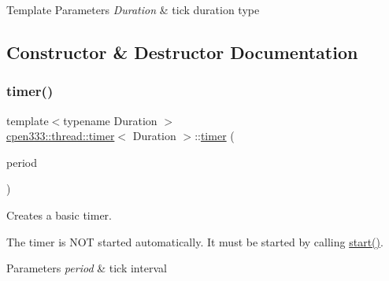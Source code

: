 \begin{DoxyTemplParams}{Template Parameters}
{\em Duration} & tick duration type \\
\hline
\end{DoxyTemplParams}


\subsection{Constructor \& Destructor Documentation}
\mbox{\label{classcpen333_1_1thread_1_1timer_adf189ddfc276e7efa2c49ac9413627b9}} 
\subsubsection{\texorpdfstring{timer()}{timer()}\hspace{0.1cm}{\footnotesize\ttfamily [1/2]}}
{\footnotesize\ttfamily template$<$typename Duration $>$ \\
\hyperlink{classcpen333_1_1thread_1_1timer}{cpen333\+::thread\+::timer}$<$ Duration $>$\+::\hyperlink{classcpen333_1_1thread_1_1timer}{timer} (\begin{DoxyParamCaption}\item[{const Duration \&}]{period }\end{DoxyParamCaption})\hspace{0.3cm}{\ttfamily [inline]}}



Creates a basic timer. 

The timer is N\+OT started automatically. It must be started by calling \hyperlink{classcpen333_1_1thread_1_1timer_a0d1be90402f46912966ec5fc13707bce}{start()}.


\begin{DoxyParams}{Parameters}
{\em period} & tick interval \\
\hline
\end{DoxyParams}
\mbox{\label{classcpen333_1_1thread_1_1timer_a850ad7eb401f54c5dc53ec0b01765135}} 
